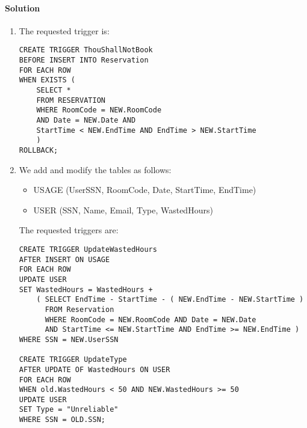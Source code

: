 \paragraph*{Solution}
\begin{enumerate}
    \item The requested trigger is: 
        \begin{lstlisting}[style=SQL]
CREATE TRIGGER ThouShallNotBook
BEFORE INSERT INTO Reservation
FOR EACH ROW
WHEN EXISTS ( 
    SELECT *
    FROM RESERVATION
    WHERE RoomCode = NEW.RoomCode
    AND Date = NEW.Date AND
    StartTime < NEW.EndTime AND EndTime > NEW.StartTime 
    )
ROLLBACK;
        \end{lstlisting}
    \item We add and modify the tables as follows: 
        \begin{itemize}
            \item USAGE (UserSSN, RoomCode, Date, StartTime, EndTime)
            \item USER (SSN, Name, Email, Type, WastedHours)
        \end{itemize}
        The requested triggers are: 
        \begin{lstlisting}[style=SQL]
CREATE TRIGGER UpdateWastedHours
AFTER INSERT ON USAGE
FOR EACH ROW
UPDATE USER
SET WastedHours = WastedHours +
    ( SELECT EndTime - StartTime - ( NEW.EndTime - NEW.StartTime )
      FROM Reservation
      WHERE RoomCode = NEW.RoomCode AND Date = NEW.Date
      AND StartTime <= NEW.StartTime AND EndTime >= NEW.EndTime )
WHERE SSN = NEW.UserSSN

CREATE TRIGGER UpdateType
AFTER UPDATE OF WastedHours ON USER
FOR EACH ROW
WHEN old.WastedHours < 50 AND NEW.WastedHours >= 50
UPDATE USER
SET Type = "Unreliable"
WHERE SSN = OLD.SSN;
        \end{lstlisting}
\end{enumerate}
